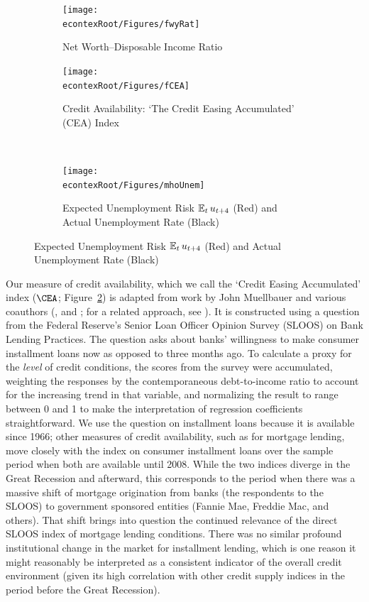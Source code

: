 \documentclass[titlepage]{\econtex}
\begin{document}
\hypertarget{fig:MainDataSeries}{}
\begin{figure}	\caption{Key Data Series} \label{fig:data}
	\centering
	\begin{subfigure}[t]{0.49\textheight}
		\centering
		{\texttt{[image: \\econtexRoot/Figures/fwyRat]}}
		\caption{Net Worth--Disposable Income Ratio}	\label{fwyRat}	
	\end{subfigure}
	\begin{subfigure}[t]{0.49\textheight}
		\centering
		{\texttt{[image: \\econtexRoot/Figures/fCEA]}}
		\caption{Credit Availability: `The Credit Easing Accumulated' (CEA) Index}\label{fCEA}
	\end{subfigure} \\
	\begin{subfigure}[t]{0.49\textheight}
		\centering
		{\texttt{[image: \\econtexRoot/Figures/mhoUnem]}}
		\caption{Expected Unemployment Risk $\operatorname{\mathbb{E}}_t u_{t+4}$ (Red) and Actual Unemployment Rate (Black)}\label{fMho}
	\end{subfigure}
\end{figure}

Our measure of credit availability, which we call the `Credit Easing Accumulated' index ($\CEA$; Figure~\ref{fCEA}) is adapted from work by John Muellbauer and various coauthors (\cite{mue07}, \cite{ducaEtAl10_creditArch} and \cite{admmmCredit}; for a related approach, see \cite{hall:slump}).  It is constructed using a question from the Federal Reserve's Senior Loan Officer Opinion Survey (SLOOS) on Bank Lending Practices. The question asks about banks' willingness to make consumer installment loans now as opposed to three months ago. To calculate a proxy for the \emph{level} of credit conditions, the scores from the survey were accumulated, weighting the responses by the contemporaneous debt-to-income ratio to account for the increasing trend in that variable, and normalizing the result to range between 0 and 1 to make the interpretation of regression coefficients straightforward.  We use the question on installment loans because it is available since 1966; other measures of credit availability, such as for mortgage lending, move closely with the index on consumer installment loans over the sample period when both are available until 2008.  While the two indices diverge in the Great Recession and afterward, this corresponds to the period when there was a massive shift of mortgage origination from banks (the respondents to the SLOOS) to government sponsored entities (Fannie Mae, Freddie Mac, and others).  That shift brings into question the continued relevance of the direct SLOOS index of mortgage lending conditions.  There was no similar profound institutional change in the market for installment lending, which is one reason it might reasonably be interpreted as a consistent indicator of the overall credit environment (given its high correlation with other credit supply indices in the period before the Great Recession).
\end{document}
